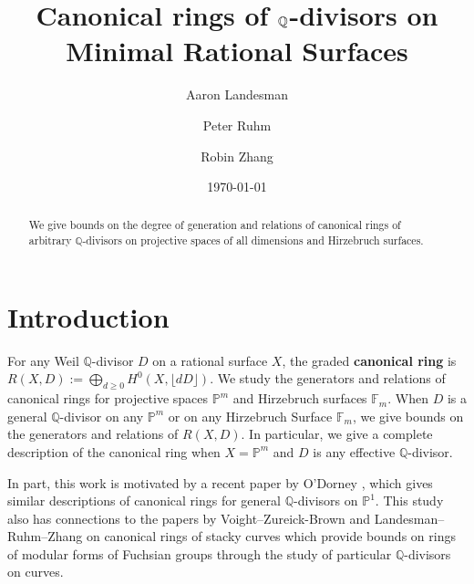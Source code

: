 \documentclass{amsart}
\title{Canonical rings of $\bq$-divisors on Minimal Rational Surfaces}
\author{Aaron Landesman}
\author{Peter Ruhm}
\author{Robin Zhang}
\date{\today}
\theoremstyle{plain}
\theoremstyle{definition}
\theoremstyle{remark}
\numberwithin{equation}{section}
\newcommand\bq{{\mathbb Q}}
\newcommand\bp{{\mathbb P}}
\newcommand\hirz{\mathbb{F}}
\begin{document}
\begin{abstract}
 	We give bounds on the degree of generation and relations of
	canonical rings of arbitrary $\bq$-divisors
	on projective spaces of all dimensions
	and Hirzebruch surfaces.
\end{abstract}

\maketitle
{}


\section{Introduction}
\label{sec:intro}
For any Weil $\bq$-divisor $D$ on a rational surface $X$, the graded
\textbf{canonical ring} is $R(X, D) := \bigoplus_{d \geq 0} H^0(X, \lfloor dD \rfloor)$.
We study the generators and relations of canonical
rings for projective spaces $\bp^m$ and Hirzebruch surfaces $\hirz_m$.
When $D$ is a general $\bq$-divisor on any $\bp^m$ or on any Hirzebruch Surface
$\hirz_m$, we give bounds on the generators and relations of
$R(X, D)$. In particular, we give a complete description of the
canonical ring when $X = \bp^m$ and $D$ is any effective
$\bq$-divisor.  

In part, this work is motivated by a recent paper by
O'Dorney \cite{dorney:canonical}, which gives similar descriptions
of canonical rings for general $\bq$-divisors on $\bp^1$. This
study also has connections to the papers by Voight--Zureick-Brown 
\cite{vzb:stacky} and Landesman--Ruhm--Zhang \cite{lrz:spin-cring}
on canonical rings of stacky curves which provide bounds
on rings of modular forms of Fuchsian groups through the study
of particular $\bq$-divisors on curves.  
\end{document}
